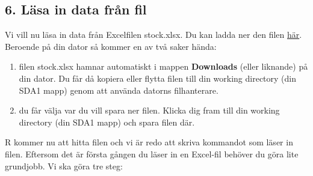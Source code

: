 \documentclass[
  letterpaper,
  DIV=11,
  numbers=noendperiod,
  oneside]{scrartcl}
\begin{document}
\hypertarget{luxe4sa-in-data-fruxe5n-fil}{%
\subsection{6. Läsa in data från
fil}\label{luxe4sa-in-data-fruxe5n-fil}}

Vi vill nu läsa in data från Excelfilen stock.xlsx. Du kan ladda ner den
filen
\href{https://github.com/StatisticsSU/SDA1/datorlabb/lab1/stock.xlsx}{här}.
Beroende på din dator så kommer en av två saker hända:

\begin{enumerate}
\def\labelenumi{\arabic{enumi}.}
\item
  filen stock.xlsx hamnar automatiskt i mappen \textbf{Downloads} (eller
  liknande) på din dator. Du får då kopiera eller flytta filen till din
  working directory (din SDA1 mapp) genom att använda datorns
  filhanterare.
\item
  du får välja var du vill spara ner filen. Klicka dig fram till din
  working directory (din SDA1 mapp) och spara filen där.
\end{enumerate}

R kommer nu att hitta filen och vi är redo att skriva kommandot som
läser in filen. Eftersom det är första gången du läser in en Excel-fil
behöver du göra lite grundjobb. Vi ska göra tre steg:
\end{document}
